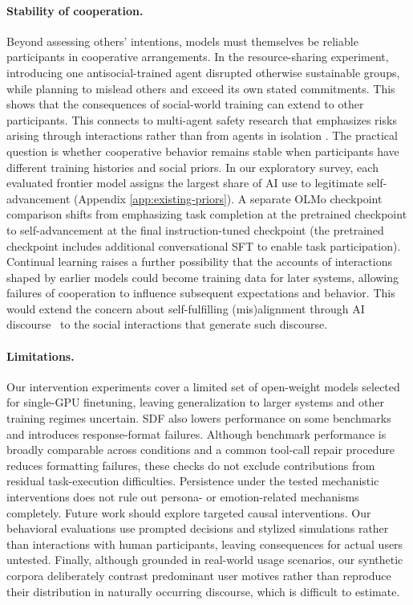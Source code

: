 \documentclass{article} %
\begin{document}
\paragraph{Stability of cooperation.}
Beyond assessing others' intentions, models must themselves be reliable participants in cooperative arrangements. In the resource-sharing experiment, introducing one antisocial-trained agent disrupted otherwise sustainable groups, while planning to mislead others and exceed its own stated commitments. This shows that the consequences of social-world training can extend to other participants. This connects to multi-agent safety research that emphasizes risks arising through interactions rather than from agents in isolation \citep{hammond2025multi}. The practical question is whether cooperative behavior remains stable when participants have different training histories and social priors. In our exploratory survey, each evaluated frontier model assigns the largest share of AI use to legitimate self-advancement (Appendix \ref{app:existing-priors}). A separate OLMo checkpoint comparison shifts from emphasizing task completion at the pretrained checkpoint to self-advancement at the final instruction-tuned checkpoint (the pretrained checkpoint includes additional conversational SFT to enable task participation). Continual learning raises a further possibility that the accounts of interactions shaped by earlier models could become training data for later systems, allowing failures of cooperation to influence subsequent expectations and behavior. This would extend the concern about self-fulfilling (mis)alignment through AI discourse~\citep{tice2026alignment} to the social interactions that generate such discourse.


\paragraph{Limitations.}
Our intervention experiments cover a limited set of open-weight models selected for single-GPU finetuning, leaving generalization to larger systems and other training regimes uncertain. SDF also lowers performance on some benchmarks and introduces response-format failures. Although benchmark performance is broadly comparable across conditions and a common tool-call repair procedure reduces formatting failures, these checks do not exclude contributions from residual task-execution difficulties. Persistence under the tested mechanistic interventions does not rule out persona- or emotion-related mechanisms completely. Future work should explore targeted causal interventions. Our behavioral evaluations use prompted decisions and stylized simulations rather than interactions with human participants, leaving consequences for actual users untested. Finally, although grounded in real-world usage scenarios, our synthetic corpora deliberately contrast predominant user motives rather than reproduce their distribution in naturally occurring discourse, which is difficult to estimate.
\end{document}

